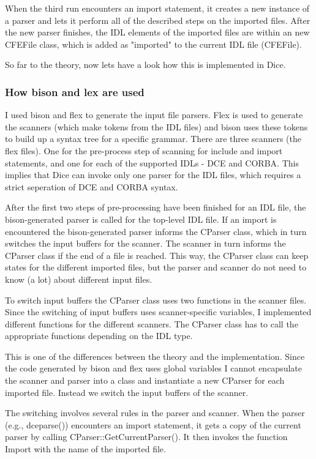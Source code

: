 When the third run encounters an import statement, it creates a new
instance of a parser and lets it perform all of the described steps on
the imported files. After the new parser finishes, the IDL elements of
the imported files are within an new CFEFile class, which is added as
"imported" to the current IDL file (CFEFile).

So far to the theory, now lets have a look how this is implemented in
Dice.

\subsubsection{How bison and lex are used}
I used bison and flex to generate the input file parsers. Flex is used
to generate the scanners (which make tokens from the IDL files) and
bison uses these tokens to build up a syntax tree for a specific
grammar. There are three scanners (the flex files). One for the
pre-process step of scanning for include and import statements, and
one for each of the supported IDLs - DCE and CORBA. This implies that
Dice can invoke only one parser for the IDL files, which requires a
strict seperation of DCE and CORBA syntax.

After the first two steps of pre-processing have been finished for an
IDL file, the bison-generated parser is called for the top-level IDL
file. If an import is encountered the bison-generated parser informs
the CParser class, which in turn switches the input buffers for the
scanner. The scanner in turn informs the CParser class if the end of a
file is reached. This way, the CParser class can keep states for the
different imported files, but the parser and scanner do not need to
know (a lot) about different input files.

To switch input buffers the CParser class uses two functions in the
scanner files. Since the switching of input buffers uses
scanner-specific variables, I implemented different functions for the
different scanners. The CParser class has to call the appropriate
functions depending on the IDL type.

This is one of the differences between the theory and the
implementation. Since the code generated by bison and flex uses global
variables I cannot encapsulate the scanner and parser into a class and
instantiate a new CParser for each imported file. Instead we switch
the input buffers of the scanner.

The switching involves several rules in the parser and scanner. When
the parser (e.g., dceparse()) encounters an import statement, it gets
a copy of the current parser by calling
CParser::GetCurrentParser(). It then invokes the function Import with
the name of the imported file.

